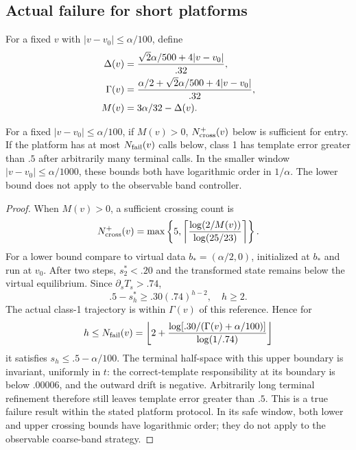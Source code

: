 \documentclass[10pt,twocolumn,letterpaper]{article}
\begin{document}
\subsection{Actual failure for short platforms}
For a fixed $v$ with $|v-v_0|\le\alpha/100$, define
\begin{align}
\Delta(v)&={\sqrt2\alpha/500+4|v-v_0|\over.32},\\
\Gamma(v)&={\alpha/2+\sqrt2\alpha/500+4|v-v_0|\over.32},\\
M(v)&=3\alpha/32-\Delta(v).
\end{align}
\begin{proposition}\label{prop:cross}
For a fixed $|v-v_0|\le\alpha/100$, if $M(v)>0$, $N_{\rm cross}^+(v)$ below is sufficient for entry. If the platform has at most $N_{\rm fail}(v)$ calls below, class 1 has template error greater than $.5$ after arbitrarily many terminal calls. In the smaller window $|v-v_0|\le\alpha/1000$, these bounds both have logarithmic order in $1/\alpha$. The lower bound does not apply to the observable band controller.
\end{proposition}
\begin{proof}
When $M(v)>0$, a sufficient crossing count is
\begin{equation}
N_{\rm cross}^+(v)=\max\left\{5,\left\lceil{\log(2/M(v))\over\log(25/23)}\right\rceil\right\}.
\end{equation}
For a lower bound compare to virtual data $b_*=(\alpha/2,0)$, initialized at $b_*$ and run at $v_0$. After two steps, $s_2^*<.20$ and the transformed state remains below the virtual equilibrium. Since $\partial_sT_s>.74$,
\begin{equation}
.5-s_h^*\ge .30(.74)^{h-2},\quad h\ge2.
\end{equation}
The actual class-1 trajectory is within $\Gamma(v)$ of this reference. Hence for
\begin{equation}
h\le N_{\rm fail}(v)=\left\lfloor2+
{\log[.30/(\Gamma(v)+\alpha/100)]\over\log(1/.74)}\right\rfloor
\end{equation}
it satisfies $s_h\le.5-\alpha/100$. The terminal half-space with this upper boundary is invariant, uniformly in $t$: the correct-template responsibility at its boundary is below $.00006$, and the outward drift is negative. Arbitrarily long terminal refinement therefore still leaves template error greater than $.5$. This is a true failure result within the stated platform protocol. In its safe window, both lower and upper crossing bounds have logarithmic order; they do not apply to the observable coarse-band strategy.
\end{proof}
\end{document}
